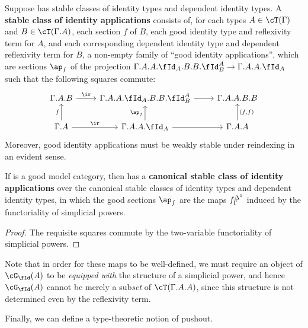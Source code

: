 \documentclass[referee]{psp}
\let\C\cC
\let\T\cT
\let\r\ir
\let\Id\fId
\let\G\cG
\begin{document}
\begin{defn}\label{defn:ap}
  Suppose \C has stable classes of identity types and dependent identity types.
  A \textbf{stable class of identity applications} consists of, for each types $A\in\T(\Gamma)$ and $B\in\T(\Gamma.A)$, each section $f$ of $B$, each good identity type and reflexivity term for $A$, and each corresponding dependent identity type and dependent reflexivity term for $B$, a non-empty family of ``good identity applications'', which are sections $\ap_f$ of the projection $\Gamma.A.A.\Id_A.B.B.\Id^A_B \to \Gamma.A.A.\Id_A$ such that the following squares commute:
  \[
  \begin{tikzcd}
    \Gamma.A.B \ar[r,"\r"] & \Gamma.A.A.\Id_A.B.B.\Id^A_B \ar[r] & \Gamma.A.A.B.B \\
    \Gamma.A \ar[r,"\r"] \ar[u,"f"] & \Gamma.A.A.\Id_A \ar[u,"{\ap_f}"] \ar[r] & \Gamma.A.A \ar[u,"{(f,f)}",swap]
  \end{tikzcd}
  \]
  Moreover, good identity applications must be weakly stable under reindexing in an evident sense.
\end{defn}

\begin{thm}\label{thm:stable-ap}
  If \sM is a good model category, then \fibm has a \textbf{canonical stable class of identity applications} over the canonical stable classes of identity types and dependent identity types, in which the good sections $\ap_f$ are the maps $f^{\Delta^1}_\Gamma$ induced by the functoriality of simplicial powers.
\end{thm}
\begin{proof}
  The requisite squares commute by the two-variable functoriality of simplicial powers.
\end{proof}

Note that in order for these maps to be well-defined, we must require an object of $\G_\Id(A)$ to be \emph{equipped with} the structure of a simplicial power, and hence $\G_\Id(A)$ cannot be merely a sub\emph{set} of $\T(\Gamma.A.A)$, since this structure is not determined even by the reflexivity term.

Finally, we can define a type-theoretic notion of pushout.
\end{document}
